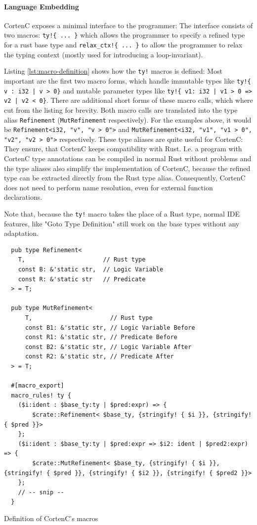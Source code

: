 \documentclass{book}
\newcommand{\code}[1]{\texttt{#1}}
\theoremstyle{definition}
\begin{document}
\paragraph{Language Embedding}
CortenC exposes a minimal interface to the programmer: The interface consists of two macros:
\code{ty!\{ ... \}} which allows the programmer to specify a refined type for a rust base type and
\code{relax\_ctx!\{ ... \}} to allow the programmer to relax the typing context (mostly used for introducing a loop-invariant). 

Listing \ref{lst:macro-definition} shows how the \code{ty!} macros is defined: Most important are the first two macro forms, which handle immutable types like \code{ty!\{ v : i32 | v > 0\}} and mutable parameter types like \code{ty!\{ v1: i32 | v1 > 0 => v2 | v2 < 0\}}. 
There are additional short forms of these macro calls, which where cut from the listing for brevity. Both macro calls are translated into the type alias \code{Refinement} (\code{MutRefinement} respectively). For the examples above, it would be \code{Refinement<i32, "v", "v > 0">} and \code{MutRefinement<i32, "v1", "v1 > 0", "v2", "v2 > 0">} respectively. These type aliases are quite useful for CortenC: They ensure, that CortenC keeps compatibility with Rust. I.e. a program with CortenC type annotations can be compiled in normal Rust without problems and the type aliases also simplify the implementation of CortenC, because the refined type can be extracted directly from the Rust type alias. Consequently, CortenC does not need to perform name resolution, even for external function declarations.

Note that, because the \code{ty!} macro takes the place of a Rust type, normal IDE features, like "Goto Type Definition" still work on the base types without any adaptation.

\begin{listing}[ht]
  \begin{verbatim}
  pub type Refinement<
    T,                      // Rust type
    const B: &'static str,  // Logic Variable
    const R: &'static str   // Predicate
  > = T;

  pub type MutRefinement<
      T,                      // Rust type
      const B1: &'static str, // Logic Variable Before
      const R1: &'static str, // Predicate Before
      const B2: &'static str, // Logic Variable After
      const R2: &'static str, // Predicate After
  > = T;

  #[macro_export]
  macro_rules! ty {
    ($i:ident : $base_ty:ty | $pred:expr) => {
        $crate::Refinement< $base_ty, {stringify! { $i }}, {stringify! { $pred }}>
    };
    ($i:ident : $base_ty:ty | $pred:expr => $i2: ident | $pred2:expr) => {
        $crate::MutRefinement< $base_ty, {stringify! { $i }}, {stringify! { $pred }}, {stringify! { $i2 }}, {stringify! { $pred2 }}>
    };
    // -- snip --
  }
  \end{verbatim}
  \caption{Definition of CortenC's macros}
  \label{lst:macro-definition}
\end{listing}
\end{document}
